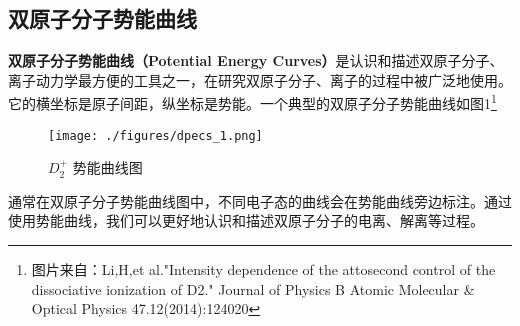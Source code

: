 
\begin{issues}
\issueDraft
\end{issues}

\subsection{双原子分子势能曲线}
\textbf{双原子分子势能曲线（Potential Energy Curves）}是认识和描述双原子分子、离子动力学最方便的工具之一，在研究双原子分子、离子的过程中被广泛地使用。
它的横坐标是原子间距，纵坐标是势能。一个典型的双原子分子势能曲线如图1\footnote{图片来自：Li,H,et al."Intensity dependence of the attosecond control of the dissociative ionization of D2." Journal of Physics B Atomic Molecular \& Optical Physics 47.12(2014):124020}

\begin{figure}[ht]
\centering
\texttt{[image: ./figures/dpecs\_1.png]}
\caption{$D_2^+$ 势能曲线图} \label{dpecs_fig1}
\end{figure}
通常在双原子分子势能曲线图中，不同电子态的曲线会在势能曲线旁边标注。通过使用势能曲线，我们可以更好地认识和描述双原子分子的电离、解离等过程。
